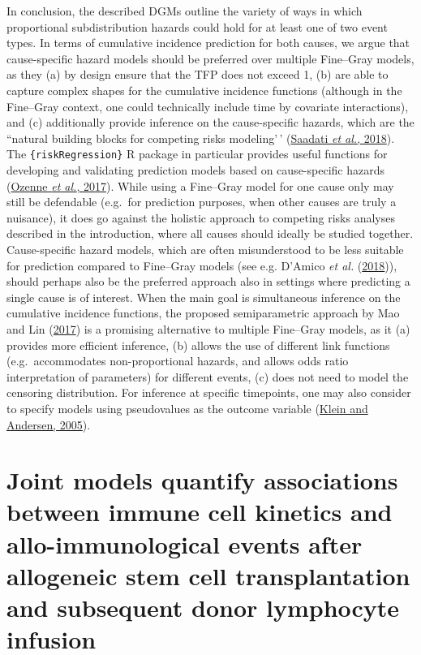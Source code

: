 \documentclass[
  letterpaper,
  DIV=11,
  numbers=noendperiod]{scrreprt}
\begin{document}
In conclusion, the described DGMs outline the variety of ways in which
proportional subdistribution hazards could hold for at least one of two
event types. In terms of cumulative incidence prediction for both
causes, we argue that cause-specific hazard models should be preferred
over multiple Fine--Gray models, as they (a) by design ensure that the
TFP does not exceed 1, (b) are able to capture complex shapes for the
cumulative incidence functions (although in the Fine--Gray context, one
could technically include time by covariate interactions), and (c)
additionally provide inference on the cause-specific hazards, which are
the ``natural building blocks for competing risks modeling'\,'
(\protect\hyperlink{ref-saadatiPredictionAccuracyVariable2018}{Saadati
\emph{et al.}, 2018}). The \texttt{\{riskRegression\}} R package in
particular provides useful functions for developing and validating
prediction models based on cause-specific hazards
(\protect\hyperlink{ref-RJ-2017-062}{Ozenne \emph{et al.}, 2017}). While
using a Fine--Gray model for one cause only may still be defendable
(e.g.~for prediction purposes, when other causes are truly a nuisance),
it does go against the holistic approach to competing risks analyses
described in the introduction, where all causes should ideally be
studied together. Cause-specific hazard models, which are often
misunderstood to be less suitable for prediction compared to Fine--Gray
models (see e.g. D'Amico \emph{et al.}
(\protect\hyperlink{ref-damicoClinicalStatesCirrhosis2018}{2018})),
should perhaps also be the preferred approach also in settings where
predicting a single cause is of interest. When the main goal is
simultaneous inference on the cumulative incidence functions, the
proposed semiparametric approach by Mao and Lin
(\protect\hyperlink{ref-maoEfficientEstimationSemiparametric2017}{2017})
is a promising alternative to multiple Fine--Gray models, as it (a)
provides more efficient inference, (b) allows the use of different link
functions (e.g.~accommodates non-proportional hazards, and allows odds
ratio interpretation of parameters) for different events, (c) does not
need to model the censoring distribution. For inference at specific
timepoints, one may also consider to specify models using pseudovalues
as the outcome variable
(\protect\hyperlink{ref-kleinRegressionModelingCompeting2005a}{Klein and
Andersen, 2005}).


\hypertarget{joint-models-quantify-associations-between-immune-cell-kinetics-and-allo-immunological-events-after-allogeneic-stem-cell-transplantation-and-subsequent-donor-lymphocyte-infusion}{%
\chapter{Joint models quantify associations between immune cell kinetics
and allo-immunological events after allogeneic stem cell transplantation
and subsequent donor lymphocyte
infusion}\label{joint-models-quantify-associations-between-immune-cell-kinetics-and-allo-immunological-events-after-allogeneic-stem-cell-transplantation-and-subsequent-donor-lymphocyte-infusion}}
\end{document}
